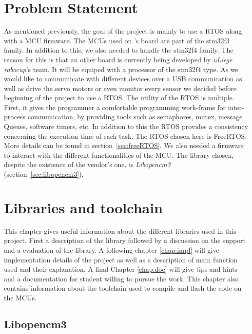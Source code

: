 \documentclass[12pt,a4paper]{report}
\begin{document}
\chapter{Problem Statement}
\label{ch:prob}
As mentioned previously, the goal of the project is mainly to use a RTOS along with a MCU firmware. The MCUs used on \cite{masterGL}'s board are part of the stm32f3 family. In addition to this, we also needed to handle the stm32f4 family. The reason for this is that an other board is currently being developed by \emph{uLiege robocup}'s team. It will be equiped with a processor of the stm32f4 type.\newline
As we would like to communicate with different devices over a USB communication as well as drive the servo motors or even monitor every sensor we decided before beginning of the project to use a RTOS.\newline
The utility of the RTOS is multiple. First, it gives the programmer a comfortable programming work-frame for inter-process communication, by providing tools such as semaphores, mutex, message Queues, software timers, etc. In addition to this the RTOS provides a consistency concerning the execution time of each task.\newline
The RTOS chosen here is FreeRTOS. More details can be found in section~\ref{sec:freeRTOS}. We also needed a firmware to interact with the different functionalities of the MCU. The library chosen, despite the existence of the vendor's one, is \emph{Libopencm3} (section~\ref{sec:libopencm3}). 
\chapter{Libraries and toolchain}

This chapter gives useful information about the different libraries used in this project. First a description of the library followed by a discussion on the support and a evaluation of the library. A following chapter \ref{chap:impl} will give implementation details of the project as well as a description of main function used and their explanation. A final Chapter \ref{chap:doc} will give tips and hints and a documentation for student willing to pursue the work. This chapter also contains information about the toolchain used to compile and flash the code on the MCUs.
\section{Libopencm3}
\end{document}
